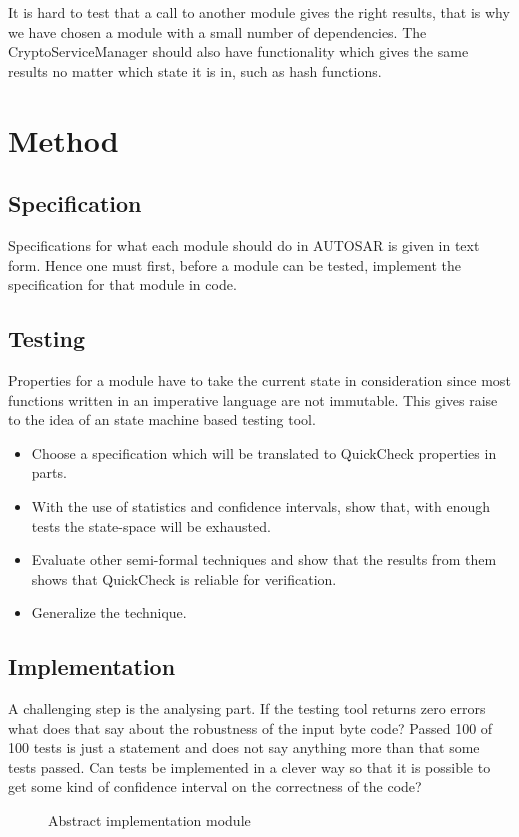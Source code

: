 \documentclass[11pt,a4paper]{report}
\begin{document}
It is hard to test that a call to another module gives the right results,
that is why we have chosen a module with a small number of
dependencies.
The CryptoServiceManager should also have functionality which gives the same
results no matter which state it is in, such as hash
functions\cite{SPEC:AUTOSAR:CSM}.


\chapter{Method}
\section{Specification}
Specifications for what each module should do in AUTOSAR is given in text form.
Hence one must first, before a module can be tested, implement the specification
for that module in code.
\section{Testing}
Properties for a module have to take the current state in consideration since
most functions written in an imperative language are not immutable. This gives
raise to the idea of an state machine based testing tool.
\begin{itemize}
\item Choose a specification which will be translated to QuickCheck properties
in parts.
\item With the use of statistics and confidence intervals, show that, with
enough tests the state-space will be exhausted.
\item Evaluate other semi-formal techniques and show that the results from them
shows that QuickCheck is reliable for verification.
\item Generalize the technique.
\end{itemize}

\section{Implementation}
A challenging step is the analysing part. If the testing tool returns zero
errors what does that say about the robustness of the input byte code? Passed
100 of 100 tests is just a statement and does not say anything more than that
some tests passed. Can tests be implemented in a clever way so that it is
possible to get some kind of confidence interval on the correctness of the code?
\begin{figure}[!ht]

\caption{Abstract implementation module}
\end{figure}
\end{document}

